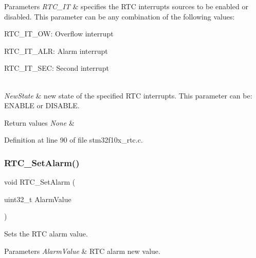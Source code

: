 \begin{DoxyParams}{Parameters}
{\em R\+T\+C\+\_\+\+IT} & specifies the R\+TC interrupts sources to be enabled or disabled. This parameter can be any combination of the following values\+: \begin{DoxyItemize}
\item R\+T\+C\+\_\+\+I\+T\+\_\+\+OW\+: Overflow interrupt \item R\+T\+C\+\_\+\+I\+T\+\_\+\+A\+LR\+: Alarm interrupt \item R\+T\+C\+\_\+\+I\+T\+\_\+\+S\+EC\+: Second interrupt \end{DoxyItemize}
\\
\hline
{\em New\+State} & new state of the specified R\+TC interrupts. This parameter can be\+: E\+N\+A\+B\+LE or D\+I\+S\+A\+B\+LE. \\
\hline
\end{DoxyParams}

\begin{DoxyRetVals}{Return values}
{\em None} & \\
\hline
\end{DoxyRetVals}


Definition at line 90 of file stm32f10x\+\_\+rtc.\+c.

\mbox{\label{group___r_t_c___exported___functions_gaec644c636a30ab5e287ba60ffc77132c}} 
\subsubsection{\texorpdfstring{R\+T\+C\+\_\+\+Set\+Alarm()}{RTC\_SetAlarm()}}
{\footnotesize\ttfamily void R\+T\+C\+\_\+\+Set\+Alarm (\begin{DoxyParamCaption}\item[{uint32\+\_\+t}]{Alarm\+Value }\end{DoxyParamCaption})}



Sets the R\+TC alarm value. 


\begin{DoxyParams}{Parameters}
{\em Alarm\+Value} & R\+TC alarm new value. \\
\hline
\end{DoxyParams}

